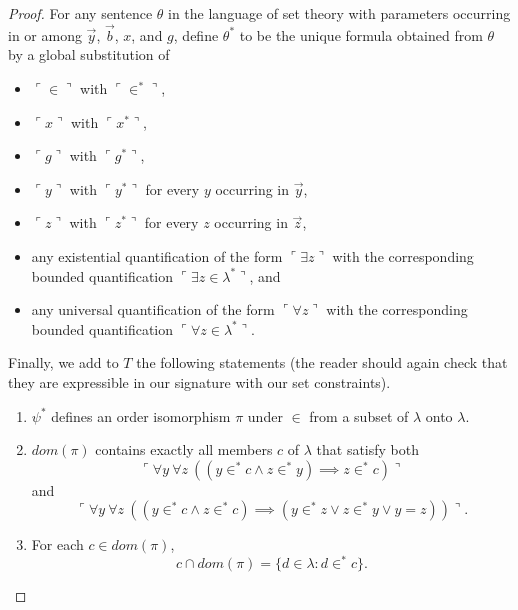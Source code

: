 \documentclass[12pt, twoside]{memoir}
\numberwithin{equation}{section}
\theoremstyle{definition}
\theoremstyle{remark}
\theoremstyle{definition}
\theoremstyle{definition}
\theoremstyle{definition}
\theoremstyle{remark}
\begin{document}
\begin{proof}
For any sentence $\theta$ in the language of set theory with parameters occurring in or among $\Vec{y}$, $\Vec{b}$, $x$, and $g$, define $\theta^*$ to be the unique formula obtained from $\theta$ by a global substitution of
\begin{itemize}
    \item $\ulcorner \in \urcorner$ with $\ulcorner \in^* \urcorner$, 
    \item $\ulcorner x \urcorner$ with $\ulcorner x^* \urcorner$, 
    \item $\ulcorner g \urcorner$ with $\ulcorner g^* \urcorner$, 
    \item $\ulcorner y \urcorner$ with $\ulcorner y^* \urcorner$ for every $y$ occurring in $\Vec{y}$, 
    \item $\ulcorner z \urcorner$ with $\ulcorner z^* \urcorner$ for every $z$ occurring in $\Vec{z}$, 
    \item any existential quantification of the form $\ulcorner \exists z \urcorner$ with the corresponding bounded quantification $\ulcorner \exists z \in \lambda^* \urcorner$, and
    \item any universal quantification of the form $\ulcorner \forall z \urcorner$ with the corresponding bounded quantification $\ulcorner \forall z \in \lambda^* \urcorner$.
\end{itemize}
Finally, we add to $T$ the following statements (the reader should again check that they are expressible in our signature with our set constraints).
\begin{enumerate}[label=(\arabic*)]
    \item $\psi^*$ defines an order isomorphism $\pi$ under $\in$ from a subset of $\lambda$ onto $\lambda$.
    \item $dom(\pi)$ contains exactly all members $c$ of $\lambda$ that satisfy both
    \begin{equation*}
        \ulcorner \forall y \ \forall z \ ((y \in^* c \wedge z \in^* y) \implies z \in^* c) \urcorner
    \end{equation*}
    and
    \begin{equation*}
        \ulcorner \forall y \ \forall z \ ((y \in^* c \wedge z \in^* c) \implies (y \in^* z \vee z \in^* y \vee y = z)) \urcorner \text{.}
    \end{equation*}
    \item For each $c \in dom(\pi)$, 
    \begin{equation*}
        c \cap dom(\pi) = \{d \in \lambda : d \in^* c\} \text{.}
    \end{equation*}

\end{enumerate}
\end{proof}
\end{document}
